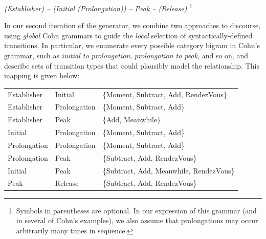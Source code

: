 {\it (Establisher) -- (Initial (Prolongation)) -- Peak -- (Release)}
\footnote{Symbols in parentheses are optional. In our expression of this grammar (and
in several of Cohn's examples), we also assume that prolongations may occur
arbitrarily many times in sequence.}

In our second iteration of the generator, we combine two
approaches to discourse, using {\em global} Cohn grammars to guide the {\em
local} selection of syntactically-defined transitions.
%
%
In particular, we enumerate every possible category bigram in Cohn's grammar,
such as {\em initial to prolongation}, {\em prolongation to peak}, and so
on, and describe sets of transition types that could plausibly model the
relationship. This mapping is given below:



{\scriptsize
\begin{tabular}{lll}
Establisher & Initial & \{Moment, Subtract, Add, RendezVous\} \\
   Establisher & Prolongation & \{Moment, Subtract, Add\} \\
   Establisher & Peak & \{Add, Meanwhile\} \\
   Initial & Prolongation & \{Moment, Subtract, Add\} \\
   Prolongation & Prolongation & \{Moment, Subtract, Add\} \\
   Prolongation & Peak & \{Subtract, Add, RendezVous\} \\
   Initial & Peak & \{Subtract, Add, Meanwhile, RendezVous\} \\
   Peak & Release & \{Subtract, Add, RendezVous\}
\end{tabular}
}

